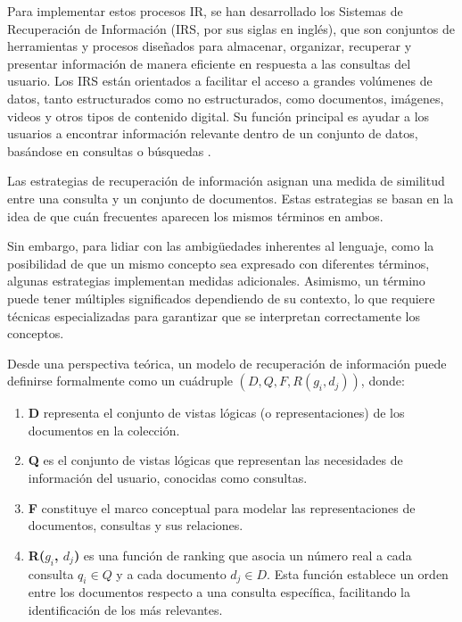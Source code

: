 Para implementar estos procesos IR, se han desarrollado los Sistemas de Recuperación 
de Información (IRS, por sus siglas en inglés), que son conjuntos de herramientas 
y procesos diseñados para almacenar, organizar, recuperar y presentar información 
de manera eficiente en respuesta a las consultas del usuario. Los IRS están orientados 
a facilitar el acceso a grandes volúmenes de datos, tanto estructurados como no estructurados, 
como documentos, imágenes, videos y otros tipos de contenido digital. Su función principal 
es ayudar a los usuarios a encontrar información relevante dentro de un conjunto de datos, 
basándose en consultas o búsquedas \cite{Ceri2013}.

Las estrategias de recuperación de información asignan una medida de similitud 
entre una consulta y un conjunto de documentos. Estas estrategias se basan en 
la idea de que cuán frecuentes aparecen los mismos términos en ambos.

Sin embargo, para lidiar con las ambigüedades inherentes al lenguaje, como la 
posibilidad de que un mismo concepto sea expresado con diferentes términos, 
algunas estrategias implementan medidas adicionales. Asimismo, un término puede 
tener múltiples significados dependiendo de su contexto, lo que requiere técnicas 
especializadas para garantizar que se interpretan correctamente los conceptos.

Desde una perspectiva teórica, un modelo de recuperación de información puede definirse 
formalmente \cite{BaezaDefinition} como un cuádruple $(D, Q, F, R(g_i, d_j))$, donde:

\begin{enumerate}
    \item \textbf{D} representa el conjunto de vistas lógicas (o representaciones) de los 
    documentos en la colección.
    \item \textbf{Q} es el conjunto de vistas lógicas que representan las necesidades de información 
    del usuario, conocidas como consultas.
    \item \textbf{F} constituye el marco conceptual para modelar las representaciones de documentos, 
    consultas y sus relaciones.
    \item \textbf{R($g_i$, $d_j$)} es una función de ranking que asocia un número real a cada 
    consulta $q_i \in Q$ y a cada documento $d_j \in D$. Esta función establece un orden entre 
    los documentos respecto a una consulta específica, facilitando la identificación de los más 
    relevantes.
\end{enumerate}

